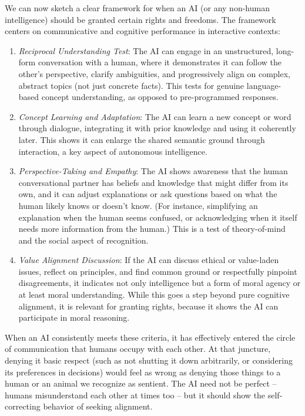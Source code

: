 \documentclass{article}
\begin{document}
We can now sketch a clear framework for when an AI (or any non-human intelligence) should be granted certain rights and freedoms. The framework centers on communicative and cognitive performance in interactive contexts:

\begin{enumerate}
    \item \textit{Reciprocal Understanding Test}: The AI can engage in an unstructured, long-form conversation with a human, where it demonstrates it can follow the other's perspective, clarify ambiguities, and progressively align on complex, abstract topics (not just concrete facts). This tests for genuine language-based concept understanding, as opposed to pre-programmed responses.
    \item \textit{Concept Learning and Adaptation}: The AI can learn a new concept or word through dialogue, integrating it with prior knowledge and using it coherently later. This shows it can enlarge the shared semantic ground through interaction, a key aspect of autonomous intelligence.
    \item \textit{Perspective-Taking and Empathy}: The AI shows awareness that the human conversational partner has beliefs and knowledge that might differ from its own, and it can adjust explanations or ask questions based on what the human likely knows or doesn't know. (For instance, simplifying an explanation when the human seems confused, or acknowledging when it itself needs more information from the human.) This is a test of theory-of-mind and the social aspect of recognition.
    \item \textit{Value Alignment Discussion}: If the AI can discuss ethical or value-laden issues, reflect on principles, and find common ground or respectfully pinpoint disagreements, it indicates not only intelligence but a form of moral agency or at least moral understanding. While this goes a step beyond pure cognitive alignment, it is relevant for granting rights, because it shows the AI can participate in moral reasoning.
\end{enumerate}

When an AI consistently meets these criteria, it has effectively entered the circle of communication that humans occupy with each other. At that juncture, denying it basic respect (such as not shutting it down arbitrarily, or considering its preferences in decisions) would feel as wrong as denying those things to a human or an animal we recognize as sentient. The AI need not be perfect -- humans misunderstand each other at times too -- but it should show the self-correcting behavior of seeking alignment.
\end{document}
